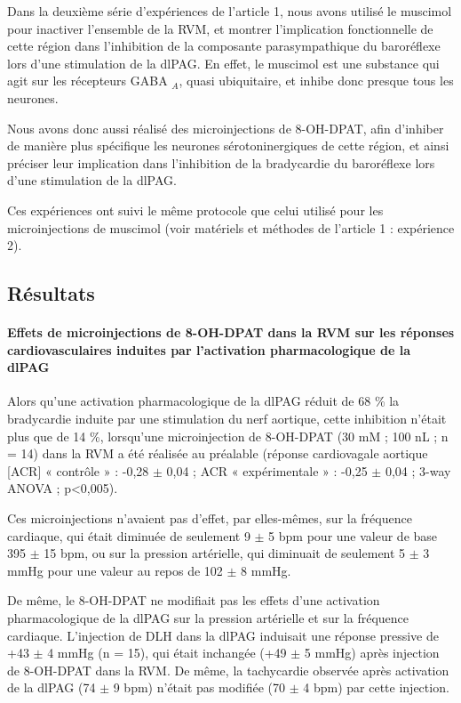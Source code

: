 \documentclass[a4paper,12pt,twoside]{report}
\begin{document}
Dans la deuxième série d’expériences de l’article 1, nous avons utilisé le muscimol pour inactiver l’ensemble de la RVM, et montrer l’implication fonctionnelle de cette région dans l’inhibition de la composante parasympathique du baroréflexe lors d’une stimulation de la dlPAG. En effet, le muscimol est une substance qui agit sur les récepteurs GABA $_{A}$, quasi ubiquitaire, et inhibe donc presque tous les neurones. 

Nous avons donc aussi réalisé des microinjections de 8-OH-DPAT, afin d’inhiber de manière plus spécifique les neurones sérotoninergiques de cette région, et ainsi préciser leur implication dans l’inhibition de la bradycardie du baroréflexe lors d’une stimulation de la dlPAG.

Ces expériences ont suivi le même protocole que celui utilisé pour les microinjections de muscimol (voir matériels et méthodes de l’article 1 : expérience 2).

\subsection{Résultats}

\paragraph{Effets de microinjections de 8-OH-DPAT dans la RVM sur les réponses cardiovasculaires induites par l’activation pharmacologique de la dlPAG}

Alors qu’une activation pharmacologique de la dlPAG réduit de 68 \% la bradycardie induite par une stimulation du nerf aortique, cette inhibition n’était plus que de 14 \%, lorsqu’une microinjection de 8-OH-DPAT (30 mM ; 100 nL ; n = 14) dans la RVM a été réalisée au préalable (réponse cardiovagale aortique [ACR] « contrôle » : -0,28 $\pm$ 0,04 ; ACR « expérimentale » : -0,25 $\pm$ 0,04 ; 3-way ANOVA ; p<0,005). 

Ces microinjections n’avaient pas d’effet, par elles-mêmes, sur la fréquence cardiaque, qui était diminuée de seulement 9 $\pm$ 5 bpm pour une valeur de base 395 $\pm$ 15 bpm, ou sur la pression artérielle, qui diminuait de seulement 5 $\pm$ 3 mmHg pour une valeur au repos de 102 $\pm$ 8 mmHg. 

De même, le 8-OH-DPAT ne modifiait pas les effets d’une activation pharmacologique de la dlPAG sur la pression artérielle et sur la fréquence cardiaque. L’injection de DLH dans la dlPAG induisait une réponse pressive de +43 $\pm$ 4 mmHg (n = 15), qui était inchangée (+49 $\pm$ 5 mmHg) après injection de 8-OH-DPAT dans la RVM. De même, la tachycardie observée après activation de la dlPAG (74 $\pm$ 9 bpm) n’était pas modifiée (70 $\pm$ 4 bpm) par cette injection. 
\end{document}
